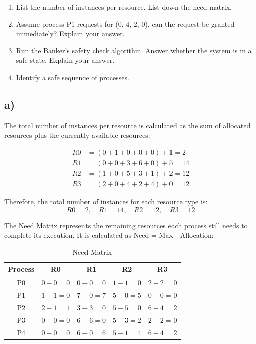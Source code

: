 \documentclass[../main.tex]{subfiles}
\begin{document}
\begin{enumerate}[label=\alph*)]
    \item List the number of instances per resource. List down the need matrix.
    \item Assume process P1 requests for (0, 4, 2, 0), can the request be granted immediately? Explain your answer.
    \item Run the Banker's safety check algorithm. Answer whether the system is in a safe state. Explain your answer.
    \item Identify a safe sequence of processes.
\end{enumerate}

\solution

\subsection*{a)}

The total number of instances per resource is calculated as the sum of allocated resources plus the currently available resources:

\vspace{-10pt}
\[
\begin{aligned}
R0 &= (0 + 1 + 0 + 0 + 0) + 1 = 2 \\
R1 &= (0 + 0 + 3 + 6 + 0) + 5 = 14 \\
R2 &= (1 + 0 + 5 + 3 + 1) + 2 = 12 \\
R3 &= (2 + 0 + 4 + 2 + 4) + 0 = 12
\end{aligned}
\]

Therefore, the total number of instances for each resource type is:
\[
R0 = 2, \quad R1 = 14, \quad R2 = 12, \quad R3 = 12
\]

\vspace{-10pt}
The Need Matrix represents the remaining resources each process still needs to complete its execution. It is calculated as Need = Max - Allocation:

\begin{table}[h]
    \centering
    \begin{tabular}{|c|cccc|}
        \hline
        \textbf{Process} & R0 & R1 & R2 & R3 \\
        \hline
        P0 & $0-0=0$ & $0-0=0$ & $1-1=0$ & $2-2=0$ \\
        P1 & $1-1=0$ & $7-0=7$ & $5-0=5$ & $0-0=0$ \\
        P2 & $2-1=1$ & $3-3=0$ & $5-5=0$ & $6-4=2$ \\
        P3 & $0-0=0$ & $6-6=0$ & $5-3=2$ & $2-2=0$ \\
        P4 & $0-0=0$ & $6-0=6$ & $5-1=4$ & $6-4=2$ \\
        \hline
    \end{tabular}
    \caption{Need Matrix}
\end{table}
\end{document}
